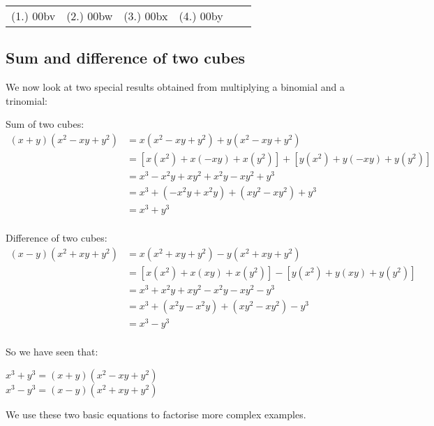 \begin{exercises}{}
{\begin{enumerate}[itemsep=5pt, label=\textbf{\arabic*}. ]
\end{enumerate}
\practiceinfo 
\par 
 \par \begin{tabular}[h]{cccccc}
 (1.) 00bv&  (2.) 00bw&  (3.) 00bx&  (4.) 00by& \end{tabular}
}
\end{exercises} 

\subsection*{Sum and difference of two cubes}      
We now look at two special results obtained from multiplying a binomial and a trinomial: \\
\par
Sum of two cubes:
\begin{align*}
  (x+y)({x}^{2}-xy+{y}^{2}) &= x({x}^{2}-xy+{y}^{2})+y({x}^{2}- xy+{y}^{2})\\
  &= \left[x({x}^{2})+x(-xy)+x({y}^{2})\right]+\left[y({x}^{2})+y(-xy)+y({y}^{2})\right]\\
  &= {x}^{3}-{x}^{2}y+x{y}^{2}+{x}^{2}y-x{y}^{2}+{y}^{3} \\
  &= {x}^{3}+(-{x}^{2}y+{x}^{2}y)+(x{y}^{2}-x{y}^{2})+{y}^{3} \\
  &= {x}^{3}+{y}^{3}\\
\end{align*}

\par
Difference of two cubes:
\begin{align*}
(x-y)({x}^{2}+xy+{y}^{2}) &= x({x}^{2}+xy+{y}^{2})-y({x}^{2}+ xy+{y}^{2})\\
  &= \left[x({x}^{2})+x(xy)+x({y}^{2})\right]-\left[y({x}^{2})+y(xy)+y({y}^{2})\right]\\
  &= {x}^{3}+{x}^{2}y+x{y}^{2}-{x}^{2}y-x{y}^{2}-{y}^{3} \\
  &= {x}^{3}+({x}^{2}y-{x}^{2}y)+(x{y}^{2}-x{y}^{2})-{y}^{3} \\
  &= {x}^{3}-{y}^{3}\\
\end{align*}

So we have seen that:
\begin{center}
${x}^{3}+{y}^{3}=(x+y)({x}^{2}-xy+{y}^{2})$\\
${x}^{3}-{y}^{3}=(x-y)({x}^{2}+xy+{y}^{2})$\\
\end{center}
\par
We use these two basic equations to factorise more complex examples.


